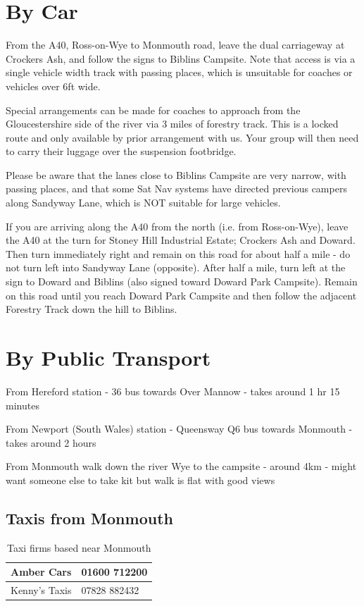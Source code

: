 \documentclass[a4paper, 11pt]{report}
\newcommand{\nl}{\newline}
\begin{document}
\section{By Car}
From the A40, Ross-on-Wye to Monmouth road, leave the dual carriageway at Crockers Ash, and follow the signs to Biblins Campsite. Note that access is via a single vehicle width track with passing places, which is unsuitable for coaches or vehicles over 6ft wide.\nl

Special arrangements can be made for coaches to approach from the Gloucestershire side of the river via 3 miles of forestry track. This is a locked route and only available by prior arrangement with us. Your group will then need to carry their luggage over the suspension footbridge.\nl

Please be aware that the lanes close to Biblins Campsite are very narrow, with passing places, and that some Sat Nav systems have directed previous campers along Sandyway Lane, which is NOT suitable for large vehicles.\nl

If you are arriving along the A40 from the north (i.e. from Ross-on-Wye), leave the A40 at the turn for Stoney Hill Industrial Estate; Crockers Ash and Doward. Then turn immediately right and remain on this road for about half a mile - do not turn left into Sandyway Lane (opposite). After half a mile, turn left at the sign to Doward and Biblins (also signed toward Doward Park Campsite). Remain on this road until you reach Doward Park Campsite and then follow the adjacent Forestry Track down the hill to Biblins.\nl

\section{By Public Transport}
From Hereford station - 36 bus towards Over Mannow - takes around 1 hr 15 minutes\nl

From Newport (South Wales) station - Queensway Q6 bus towards Monmouth - takes around 2 hours\nl

From Monmouth walk down the river Wye to the campsite - around 4km - might want someone else to take kit but walk is flat with good views\nl

\subsection{Taxis from Monmouth}
\begin{table}[H]
    \centering
    \begin{tabular}{p{} p{}}
        \hline
        Amber Cars & 01600 712200\\
        \hline
        Kenny's Taxis & 07828 882432\\
        \hline
    \end{tabular}
    \caption{Taxi firms based near Monmouth}
\end{table}
\end{document}
